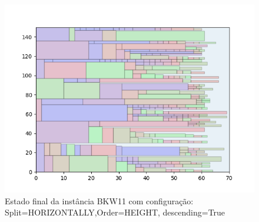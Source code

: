 \begin{figure}[H]
    \centering
    \caption[]{Estado final da instância BKW11 com configuração: Split=HORIZONTALLY,Order=HEIGHT, descending=True}
    \label{fig:bkw11-horizontally-height-true}
    \includegraphics[scale=0.5]{output/figures/bkw/bkw11/horizontally/height/true/000}
\end{figure}